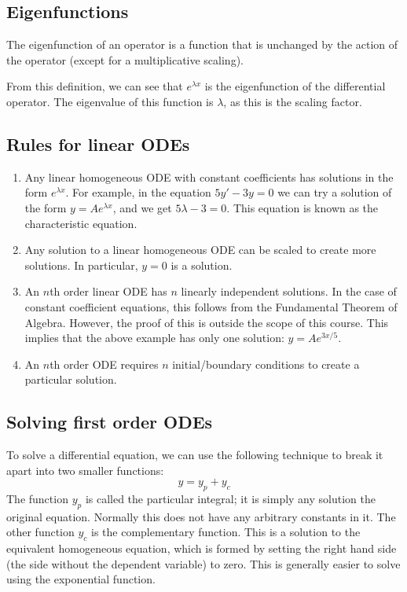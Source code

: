 \subsection{Eigenfunctions}
\begin{definition}
	The eigenfunction of an operator is a function that is unchanged by the action of the operator (except for a multiplicative scaling).
\end{definition}
From this definition, we can see that \(e^{\lambda x}\) is the eigenfunction of the differential operator.
The eigenvalue of this function is \(\lambda\), as this is the scaling factor.

\subsection{Rules for linear ODEs}
\begin{enumerate}
	\item Any linear homogeneous ODE with constant coefficients has solutions in the form \(e^{\lambda x}\).
	      For example, in the equation \(5y' - 3y = 0\) we can try a solution of the form \(y = Ae^{\lambda x}\), and we get \(5 \lambda - 3 = 0\).
	      This equation is known as the characteristic equation.
	\item Any solution to a linear homogeneous ODE can be scaled to create more solutions.
	      In particular, \(y=0\) is a solution.
	\item An \(n\)th order linear ODE has \(n\) linearly independent solutions.
	      In the case of constant coefficient equations, this follows from the Fundamental Theorem of Algebra.
	      However, the proof of this is outside the scope of this course.
	      This implies that the above example has only one solution: \(y = Ae^{3x/5}\).
	\item An \(n\)th order ODE requires \(n\) initial/boundary conditions to create a particular solution.
\end{enumerate}

\subsection{Solving first order ODEs}
To solve a differential equation, we can use the following technique to break it apart into two smaller functions:
\[
	y = y_p + y_c
\]
The function \(y_p\) is called the particular integral; it is simply any solution
the original equation.
Normally this does not have any arbitrary constants in it.
The other function \(y_c\) is the complementary function.
This is a solution to the equivalent homogeneous equation, which is formed by setting the right hand side (the side without the dependent variable) to zero.
This is generally easier to solve using the exponential function.

